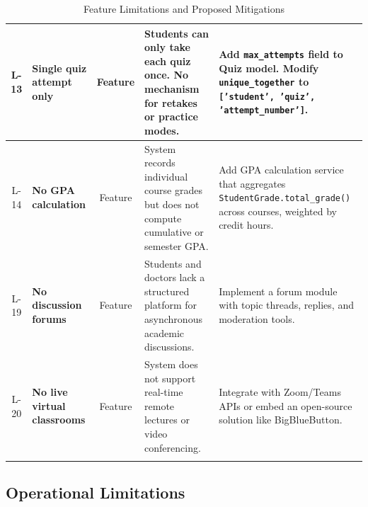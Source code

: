 \begin{longtable}{|c|p{2.5cm}|c|p{3.5cm}|p{4.5cm}|}
    \hline
    L-13 & \textbf{Single quiz attempt only} & Feature & Students can only take each quiz once. No mechanism for retakes or practice modes. & Add \texttt{max\_attempts} field to Quiz model. Modify \texttt{unique\_together} to \texttt{['student', 'quiz', 'attempt\_number']}. \\
    \hline
    L-14 & \textbf{No GPA calculation} & Feature & System records individual course grades but does not compute cumulative or semester GPA. & Add GPA calculation service that aggregates \texttt{StudentGrade.total\_grade()} across courses, weighted by credit hours. \\
    \hline
    L-19 & \textbf{No discussion forums} & Feature & Students and doctors lack a structured platform for asynchronous academic discussions. & Implement a forum module with topic threads, replies, and moderation tools. \\
    \hline
    L-20 & \textbf{No live virtual classrooms} & Feature & System does not support real-time remote lectures or video conferencing. & Integrate with Zoom/Teams APIs or embed an open-source solution like BigBlueButton. \\
    \hline
    \caption{Feature Limitations and Proposed Mitigations}
    \label{tab:feature-limitations}
\end{longtable}
\endgroup

\newpage
\subsection{Operational Limitations}

